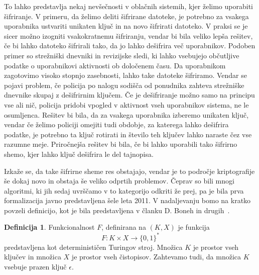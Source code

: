 \documentclass[12pt,a4paper,openany,tikz]{book}
\theoremstyle{plain}
\theoremstyle{definition}
\newtheorem{defn}[thm]{Definicija} %
\begin{document}
To lahko predstavlja nekaj nevšečnosti v oblačnih sistemih, kjer želimo uporabiti šifriranje. V primeru, da želimo deliti šifrirane datoteke, je potrebno za vsakega uporabnika ustvariti unikaten ključ in na novo šifrirati datoteko. V praksi se je sicer možno izogniti vsakokratnemu šifriranju, vendar bi bila veliko lepša rešitev, če bi lahko datoteko šifrirali tako, da jo lahko dešifrira več uporabnikov. Podoben primer so strežniški dnevniki in revizijske sledi, ki lahko vsebujejo občutljive podatke o uporabnikovi aktivnosti ob določenem času. Da uporabnikom zagotovimo visoko stopnjo zasebnosti, lahko take datoteke šifriramo. Vendar se pojavi problem, če policija po nalogu sodišča od ponudnika zahteva strežniške dnevnike skupaj z dešifrirnim ključem. Če je dešifriranje možno samo na principu vse ali nič, policija pridobi vpogled v aktivnost vseh uporabnikov sistema, ne le osumljenca. Rešitev bi bila, da za vsakega uporabnika izberemo unikaten ključ, vendar če želimo policiji omejiti tudi obdobje, za katerega lahko dešifrira podatke, je potrebno ta ključ rotirati in število teh ključev lahko naraste čez vse razumne meje. Priročnejša rešitev bi bila, če bi lahko uporabili tako šifrirno shemo, kjer lahko ključ dešifrira le del tajnopisa.

Izkaže se, da take šifrirne sheme res obstajajo, vendar je to področje kriptografije še dokaj novo in obstaja še veliko odprtih problemov. Čeprav so bili mnogi algoritmi, ki jih sedaj uvrščamo v to kategorijo odkriti že prej, pa je bila prva formalizacija javno predstavljena šele leta 2011. V nadaljevanju bomo na kratko povzeli definicijo, kot je bila predstavljena v članku D. Boneh in drugih~\cite{boneh2011functional}.

\begin{mdframed}[frametitle={Funkcionalnost}]
\begin{defn}
Funkcionalnost $F$, definirana na $(K, X)$ je funkcija $$F: K \times X \rightarrow {\{}0,1{\}}^*$$ predstavljena kot determinističen Turingov stroj. Množica $K$ je prostor vseh ključev in množica $X$ je prostor vseh čistopisov. Zahtevamo tudi, da množica $K$ vsebuje prazen ključ $\epsilon$.
\label{def:fun}
\end{defn}
\end{mdframed}
\end{document}
